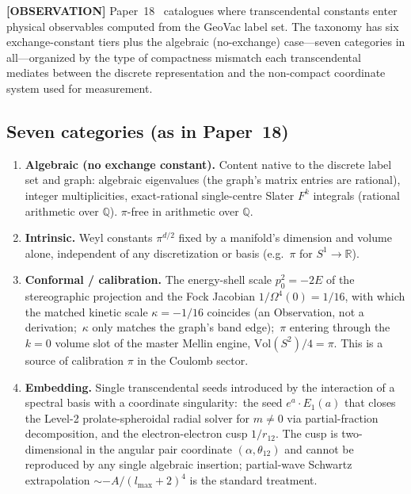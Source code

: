 \documentclass[aps,pra,twocolumn,superscriptaddress,longbibliography]{revtex4-2}
\begin{document}
\textbf{[OBSERVATION]} Paper~18~\cite{loutey_paper18} catalogues where transcendental
constants enter physical observables computed from the GeoVac label set.
The taxonomy has six exchange-constant tiers plus the algebraic
(no-exchange) case---seven categories in all---organized by the type of
compactness mismatch each transcendental mediates between the discrete
representation and the non-compact coordinate system used for
measurement.

\subsection*{Seven categories (as in Paper~18)}

\begin{enumerate}
\item \textbf{Algebraic (no exchange constant).}  Content native to the
discrete label set and graph: algebraic eigenvalues (the graph's matrix
entries are rational), integer multiplicities, exact-rational
single-centre Slater $F^k$ integrals (rational arithmetic over $\mathbb{Q}$).  $\pi$-free in arithmetic over
$\mathbb{Q}$.

\item \textbf{Intrinsic.}  Weyl constants $\pi^{d/2}$ fixed by a
manifold's dimension and volume alone, independent of any
discretization or basis (e.g.\ $\pi$ for $S^1 \to \mathbb{R}$).

\item \textbf{Conformal / calibration.}  The energy-shell scale
$p_0^2 = -2E$ of the stereographic projection and the Fock Jacobian
$1/\Omega^4(0) = 1/16$, with which the matched kinetic scale
$\kappa = -1/16$ coincides (an Observation, not a derivation;\ $\kappa$
only matches the graph's band edge);\ $\pi$ entering through the
$k = 0$ volume slot of the master Mellin engine,
$\text{Vol}(S^2)/4 = \pi$.  This is a source of calibration
$\pi$ in the Coulomb sector.

\item \textbf{Embedding.}  Single transcendental seeds introduced by
the interaction of a spectral basis with a coordinate singularity:\ the
seed $e^a \cdot E_1(a)$ that closes the Level-2 prolate-spheroidal
radial solver for $m \neq 0$ via partial-fraction decomposition, and
the electron-electron cusp $1/r_{12}$.  The cusp is two-dimensional in
the angular pair coordinate $(\alpha, \theta_{12})$ and cannot be
reproduced by any single algebraic insertion; partial-wave Schwartz
extrapolation $\sim -A/(l_{\max} + 2)^4$ is the standard treatment.


\end{enumerate}
\end{document}
